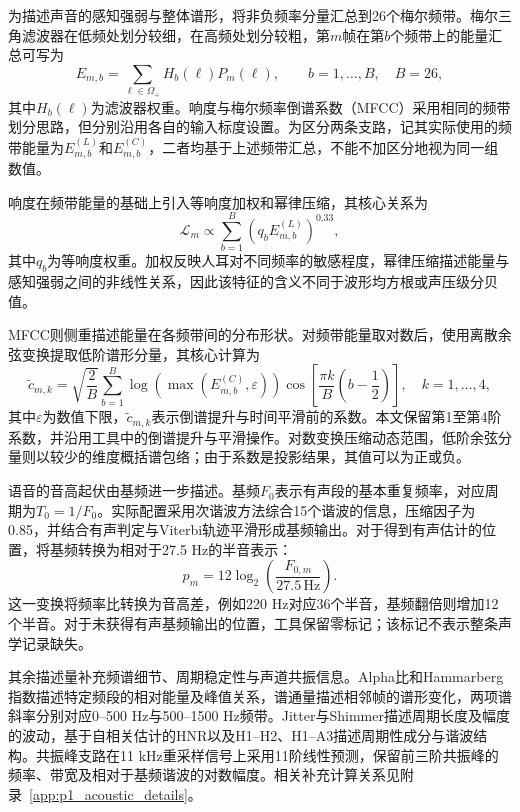 为描述声音的感知强弱与整体谱形，将非负频率分量汇总到26个梅尔频带。梅尔三角滤波器在低频处划分较细，在高频处划分较粗，第$m$帧在第$b$个频带上的能量汇总可写为
\begin{equation}
    E_{m,b}=\sum_{\ell\in\Omega_+}H_b(\ell)P_m(\ell),
    \qquad b=1,\ldots,B,\quad B=26,
    \label{eq:p1_mel_energy}
\end{equation}
其中$H_b(\ell)$为滤波器权重。响度与梅尔频率倒谱系数（MFCC）采用相同的频带划分思路，但分别沿用各自的输入标度设置。为区分两条支路，记其实际使用的频带能量为$E^{(L)}_{m,b}$和$E^{(C)}_{m,b}$，二者均基于上述频带汇总，不能不加区分地视为同一组数值。

响度在频带能量的基础上引入等响度加权和幂律压缩，其核心关系为
\begin{equation}
    \mathcal{L}_m\propto\sum_{b=1}^{B}
    \left(q_bE^{(L)}_{m,b}\right)^{0.33},
    \label{eq:p1_loudness}
\end{equation}
其中$q_b$为等响度权重。加权反映人耳对不同频率的敏感程度，幂律压缩描述能量与感知强弱之间的非线性关系，因此该特征的含义不同于波形均方根或声压级分贝值。

MFCC则侧重描述能量在各频带间的分布形状。对频带能量取对数后，使用离散余弦变换提取低阶谱形分量，其核心计算为
\begin{equation}
    \widetilde c_{m,k}=\sqrt{\frac{2}{B}}
    \sum_{b=1}^{B}\log\!\left(\max\!\left(E^{(C)}_{m,b},\varepsilon\right)\right)
    \cos\!\left[\frac{\pi k}{B}\left(b-\frac12\right)\right],
    \quad k=1,\ldots,4,
    \label{eq:p1_mfcc}
\end{equation}
其中$\varepsilon$为数值下限，$\widetilde c_{m,k}$表示倒谱提升与时间平滑前的系数。本文保留第1至第4阶系数，并沿用工具中的倒谱提升与平滑操作。对数变换压缩动态范围，低阶余弦分量则以较少的维度概括谱包络；由于系数是投影结果，其值可以为正或负。

语音的音高起伏由基频进一步描述。基频$F_0$表示有声段的基本重复频率，对应周期为$T_0=1/F_0$。实际配置采用次谐波方法综合15个谐波的信息，压缩因子为0.85，并结合有声判定与Viterbi轨迹平滑形成基频输出。对于得到有声估计的位置，将基频转换为相对于27.5 Hz的半音表示：
\begin{equation}
    p_m=12\log_2\!\left(\frac{F_{0,m}}{27.5\,\mathrm{Hz}}\right).
    \label{eq:p1_pitch_semitone}
\end{equation}
这一变换将频率比转换为音高差，例如220 Hz对应36个半音，基频翻倍则增加12个半音。对于未获得有声基频输出的位置，工具保留零标记；该标记不表示整条声学记录缺失。

其余描述量补充频谱细节、周期稳定性与声道共振信息。Alpha比和Hammarberg指数描述特定频段的相对能量及峰值关系，谱通量描述相邻帧的谱形变化，两项谱斜率分别对应0--500 Hz与500--1500 Hz频带。Jitter与Shimmer描述周期长度及幅度的波动，基于自相关估计的HNR以及H1--H2、H1--A3描述周期性成分与谐波结构。共振峰支路在11 kHz重采样信号上采用11阶线性预测，保留前三阶共振峰的频率、带宽及相对于基频谐波的对数幅度。相关补充计算关系见附录~\ref{app:p1_acoustic_details}。

